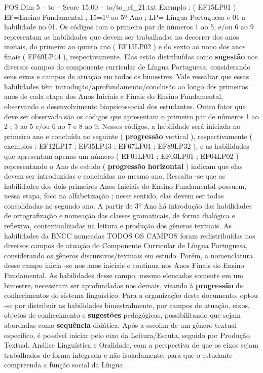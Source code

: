 \begin{textsample}{POS Dim 5 – to – Score 15.00 – to/to\_ef\_21.txt}
Exemplo : ( EF15LP01 ) EF=Ensino Fundamental ; 15=1º ao 5º Ano ; LP= Língua Portuguesa e 01 a habilidade no 01.
Os códigos com o primeiro par de números 1 ao 5, e/ou 6 ao 9 representam as habilidades que devem ser trabalhadas no decorrer dos anos iniciais, do primeiro ao quinto ano ( EF15LP02 ) e do sexto ao nono dos anos finais ( EF69LP44 ), respectivamente.
Elas estão distribuídas como \textbf{sugestão} nos diversos campos do componente curricular de Língua Portuguesa, considerando seus eixos e campos de atuação em todos os bimestres.
Vale ressaltar que essas habilidades têm introdução/aprofundamento/conclusão ao longo dos primeiros anos de cada etapa dos Anos Iniciais e Finais do Ensino Fundamental, observando o desenvolvimento biopsicossocial dos estudantes.
Outro fator que deve ser observado são os códigos que apresentam o primeiro par de números 1 ao 2 ; 3 ao 5 e/ou 6 ao 7 e 8 ao 9.
Nesses códigos, a habilidade será iniciada no primeiro ano e concluída no seguinte ( \textbf{progressão} vertical ), respectivamente ( exemplos : EF12LP17 ; EF35LP13 ; EF67LP01 ; EF89LP32 ), e as habilidades que apresentam apenas um número ( EF01LP01 ; EF03LP01 ; EF04LP02 ) representando o Ano de estudo ( \textbf{progressão} \textbf{horizontal} ) indicam que elas devem ser introduzidas e concluídas no mesmo ano.
Ressalta -se que as habilidades dos dois primeiros Anos Iniciais do Ensino Fundamental possuem, nessa etapa, foco na alfabetização ; nesse sentido, elas devem ser todas consolidadas no segundo ano.
A partir de 3º Ano há introdução das habilidades de ortografização e nomeação das classes gramaticais, de forma dialógica e reflexiva, contextualizadas na leitura e produção dos gêneros textuais.
As habilidades da BNCC nomeadas TODOS OS CAMPOS foram redistribuídas nos diversos campos de atuação do Componente Curricular de Língua Portuguesa, considerando os gêneros discursivos/textuais em estudo.
Porém, a nomenclatura desse campo inicia -se nos anos iniciais e continua nos Anos Finais do Ensino Fundamental.
As habilidades desse campo, mesmo elencadas somente em um bimestre, necessitam ser aprofundadas nos demais, visando à \textbf{progressão} de conhecimentos do sistema linguístico.
Para a organização deste documento, optou -se por distribuir as habilidades bimestralmente, por campos de atuação, eixos, objetos de conhecimento e \textbf{sugestões} pedagógicas, possibilitando que sejam abordadas como \textbf{sequência} didática.
Após a escolha de um gênero textual específico, é possível iniciar pelo eixo da Leitura/Escuta, seguido por Produção Textual, Análise Linguística e Oralidade, com a perspectiva de que os eixos sejam trabalhados de forma integrada e não isoladamente, para que o estudante compreenda a função social da Língua.

\end{textsample}
